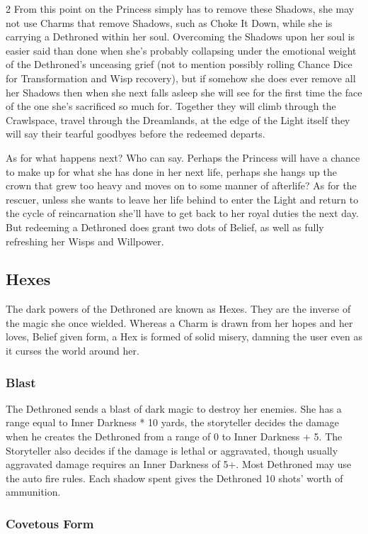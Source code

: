 \begin{multicols}{2}
From this point on the Princess simply has to remove these Shadows, she may not use Charms that remove Shadows, such as Choke It Down, while she is carrying a Dethroned within her soul. Overcoming the Shadows upon her soul is easier said than done when she's probably collapsing under the emotional weight of the Dethroned's unceasing grief (not to mention possibly rolling Chance Dice for Transformation and Wisp recovery), but if somehow she does ever remove all her Shadows then when she next falls asleep she will see for the first time the face of the one she's sacrificed so much for. Together they will climb through the Crawlspace, travel through the Dreamlands, at the edge of the Light itself they will say their tearful goodbyes before the redeemed departs. 

As for what happens next? Who can say. Perhaps the Princess will have a chance to make up for what she has done in her next life, perhaps she hangs up the crown that grew too heavy and moves on to some manner of afterlife? As for the rescuer, unless she wants to leave her life behind to enter the Light and return to the cycle of reincarnation she'll have to get back to her royal duties the next day. But redeeming a Dethroned does grant two dots of Belief, as well as fully refreshing her Wisps and Willpower. 

\subsection*{Hexes}
The dark powers of the Dethroned are known as Hexes. They are the inverse of the magic she once wielded. Whereas a Charm is drawn from her hopes and her loves, Belief given form, a Hex is formed of solid misery, damning the user even as it curses the world around her. 

\subsubsection*{Blast}

The Dethroned sends a blast of dark magic to destroy her enemies. She has a range equal to Inner Darkness * 10 yards, the storyteller decides the damage when he creates the Dethroned from a range of 0 to Inner Darkness + 5. The Storyteller also decides if the damage is lethal or aggravated, though usually aggravated damage requires an Inner Darkness of 5+. Most Dethroned may use the auto fire rules. Each shadow spent gives the Dethroned 10 shots' worth of ammunition.

\subsubsection*{Covetous Form}


\end{multicols}
